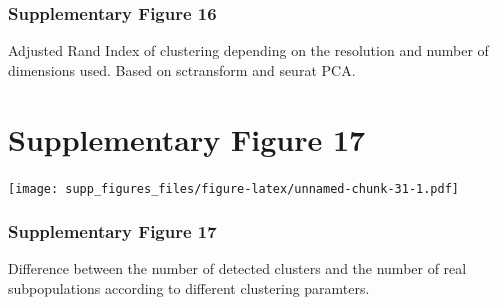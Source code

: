 \documentclass[]{article}
\begin{document}
\hypertarget{supplementary-figure-16-1}{%
\subsubsection{Supplementary Figure
16}\label{supplementary-figure-16-1}}

Adjusted Rand Index of clustering depending on the resolution and number
of dimensions used. Based on sctransform and seurat PCA.

\hypertarget{supplementary-figure-17}{%
\section{Supplementary Figure 17}\label{supplementary-figure-17}}

\texttt{[image: supp\_figures\_files/figure-latex/unnamed-chunk-31-1.pdf]}

\hypertarget{supplementary-figure-17-1}{%
\subsubsection{Supplementary Figure
17}\label{supplementary-figure-17-1}}

Difference between the number of detected clusters and the number of
real subpopulations according to different clustering paramters.

\newpage


\end{document}
